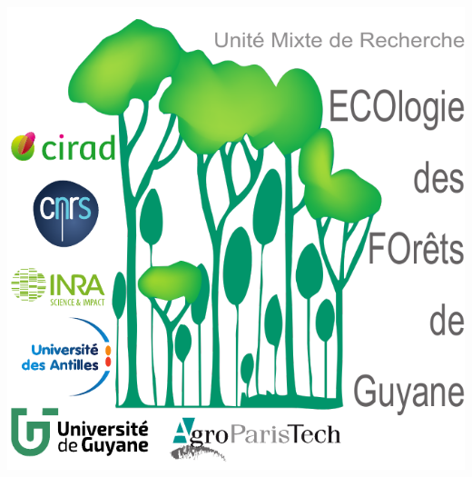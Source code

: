\documentclass[
  11pt,
  french,
  A4paper,
  extrafontsizes,onecolumn,openright
  ]{memoir}
\begin{document}
\vspace*{\fill}
\centering\includegraphics[width=.3\textwidth]{images/Logo-Lab}
\end{document}
